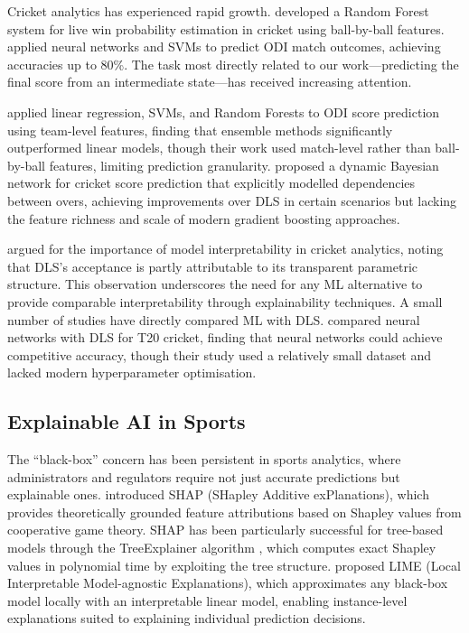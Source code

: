 \documentclass[10pt,a4paper,twocolumn]{article}
\begin{document}
Cricket analytics has experienced rapid growth. \citet{sankaranarayanan2014auto} developed a Random Forest system for live win probability estimation in cricket using ball-by-ball features. \citet{passi2018cricket} applied neural networks and SVMs to predict ODI match outcomes, achieving accuracies up to 80\%. The task most directly related to our work---predicting the final score from an intermediate state---has received increasing attention.

\citet{jhanwar2016predicting} applied linear regression, SVMs, and Random Forests to ODI score prediction using team-level features, finding that ensemble methods significantly outperformed linear models, though their work used match-level rather than ball-by-ball features, limiting prediction granularity. \citet{viswanadha2017dynamic} proposed a dynamic Bayesian network for cricket score prediction that explicitly modelled dependencies between overs, achieving improvements over DLS in certain scenarios but lacking the feature richness and scale of modern gradient boosting approaches.

\citet{kampakis2015using} argued for the importance of model interpretability in cricket analytics, noting that DLS's acceptance is partly attributable to its transparent parametric structure. This observation underscores the need for any ML alternative to provide comparable interpretability through explainability techniques. A small number of studies have directly compared ML with DLS. \citet{davis2015investigating} compared neural networks with DLS for T20 cricket, finding that neural networks could achieve competitive accuracy, though their study used a relatively small dataset and lacked modern hyperparameter optimisation.

\subsection{Explainable AI in Sports}

The ``black-box'' concern has been persistent in sports analytics, where administrators and regulators require not just accurate predictions but explainable ones. \citet{lundberg2017unified} introduced SHAP (SHapley Additive exPlanations), which provides theoretically grounded feature attributions based on Shapley values from cooperative game theory. SHAP has been particularly successful for tree-based models through the TreeExplainer algorithm \citep{lundberg2020local}, which computes exact Shapley values in polynomial time by exploiting the tree structure. \citet{ribeiro2016should} proposed LIME (Local Interpretable Model-agnostic Explanations), which approximates any black-box model locally with an interpretable linear model, enabling instance-level explanations suited to explaining individual prediction decisions.
\end{document}
